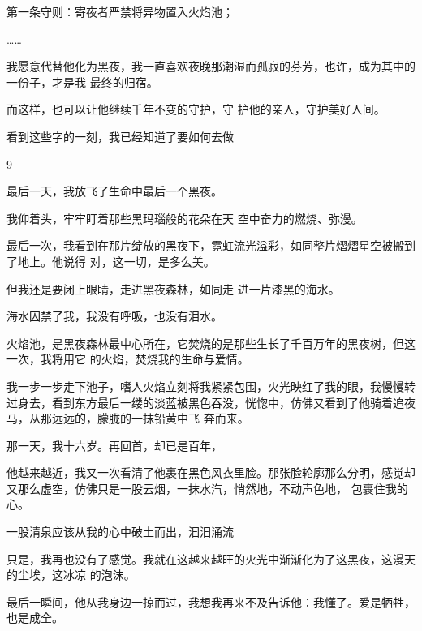 \documentclass{article}
\begin{document}
第一条守则：寄夜者严禁将异物置入火焰池；


…… 

我愿意代替他化为黑夜，我一直喜欢夜晚那潮湿而孤寂的芬芳，也许，成为其中的一份子，才是我
最终的归宿。 

而这样，也可以让他继续千年不变的守护，守
护他的亲人，守护美好人间。 

看到这些字的一刻，我已经知道了要如何去做


9 


最后一天，我放飞了生命中最后一个黑夜。 

我仰着头，牢牢盯着那些黑玛瑙般的花朵在天
空中奋力的燃烧、弥漫。 

\newpage

最后一次，我看到在那片绽放的黑夜下，霓虹流光溢彩，如同整片熠熠星空被搬到了地上。他说得
对，这一切，是多么美。 

但我还是要闭上眼睛，走进黑夜森林，如同走
进一片漆黑的海水。 


海水囚禁了我，我没有呼吸，也没有泪水。 

火焰池，是黑夜森林最中心所在，它焚烧的是那些生长了千百万年的黑夜树，但这一次，我将用它
的火焰，焚烧我的生命与爱情。 

我一步一步走下池子，嗜人火焰立刻将我紧紧包围，火光映红了我的眼，我慢慢转过身去，看到东方最后一缕的淡蓝被黑色吞没，恍惚中，仿佛又看到了他骑着追夜马，从那远远的，朦胧的一抹铅黄中飞
奔而来。 


那一天，我十六岁。再回首，却已是百年， 

\newpage

他越来越近，我又一次看清了他裹在黑色风衣里脸。那张脸轮廓那么分明，感觉却又那么虚空，仿佛只是一股云烟，一抹水汽，悄然地，不动声色地，
包裹住我的心。 

一股清泉应该从我的心中破土而出，汩汩涌流

只是，我再也没有了感觉。我就在这越来越旺的火光中渐渐化为了这黑夜，这漫天的尘埃，这冰凉
的泡沫。 

最后一瞬间，他从我身边一掠而过，我想我再来不及告诉他：我懂了。爱是牺牲，也是成全。
\end{document}

